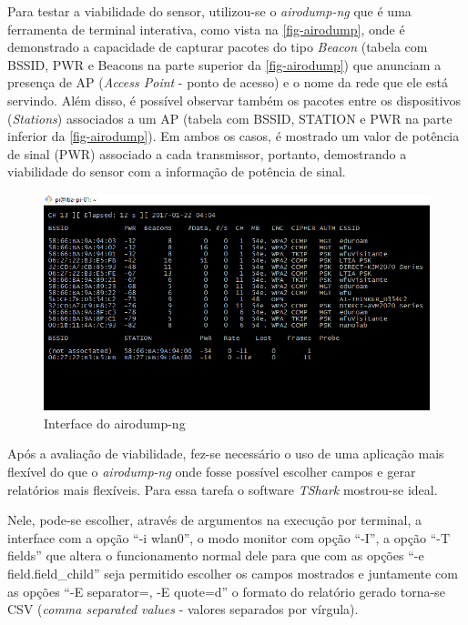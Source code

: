 Para testar a viabilidade do sensor, utilizou-se o \emph{airodump-ng} que é uma
ferramenta de terminal interativa, como vista na \autoref{fig-airodump}, onde é
demonstrado a capacidade de capturar pacotes do tipo \emph{Beacon} (tabela com
BSSID, PWR e Beacons na parte superior da \autoref{fig-airodump}) que anunciam
a presença de AP (\emph{Access Point} - ponto de acesso) e o nome da rede que
ele está servindo. Além disso, é possível observar também os pacotes entre os dispositivos (\emph{Stations})
associados a um AP (tabela com BSSID, STATION e PWR na parte inferior da
\autoref{fig-airodump}). Em ambos os casos, é mostrado um valor de potência de
sinal (PWR) associado a cada transmissor, portanto, demostrando a viabilidade
do sensor com a informação de potência de sinal.

\begin{figure}[htb]
	\caption{\label{fig-airodump}Interface do airodump-ng}
	\begin{center}
	\includegraphics[width=1\textwidth]{040-plataformas/RPi-WiFi-dongles/wifi-sniff-rpi/4-rpi-airodump.png}
	\end{center}
\end{figure}


Após a avaliação de viabilidade, fez-se necessário o uso de uma aplicação mais
flexível do que o \emph{airodump-ng} onde fosse possível escolher campos e gerar
relatórios mais flexíveis. Para essa tarefa o software \emph{TShark} mostrou-se
ideal.

Nele, pode-se escolher, através de argumentos na execução por terminal, a
interface com a opção “-i wlan0”, o modo monitor com opção “-I”, a opção “-T
fields” que altera o funcionamento normal dele para que com as opções “-e
field.field\_child” seja permitido escolher os campos mostrados e juntamente com
as opções “-E separator=, -E quote=d” o formato do relatório gerado torna-se CSV
(\emph{comma separated values} - valores separados por vírgula).

